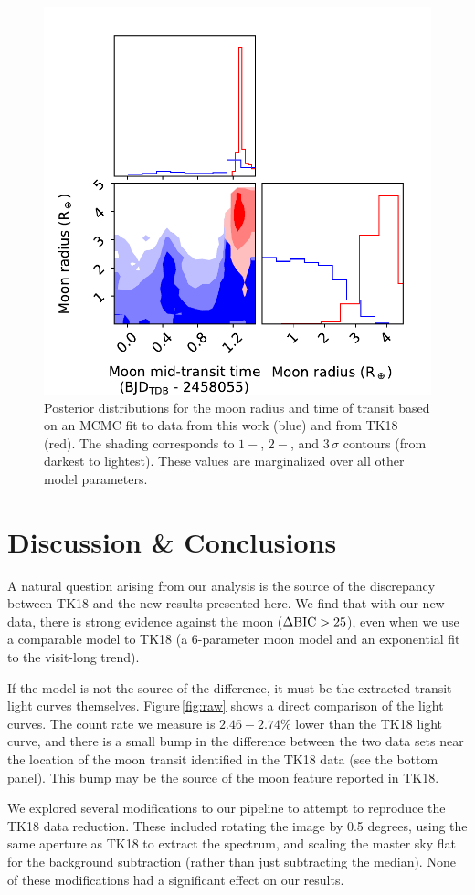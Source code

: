\documentclass[twocolumn]{aastex62}
\begin{document}
\begin{figure}
\includegraphics[width = 0.5 \textwidth]{fig5_pairs.pdf}
    \caption{Posterior distributions for the moon radius and time of transit based on an MCMC fit to data from this work (blue) and from TK18 (red). The shading corresponds to $1-$, $2-$, and $3\,\sigma$ contours (from darkest to lightest). These values are marginalized over all other model parameters.} 
\label{fig:corner}
\end{figure}

\section{Discussion \& Conclusions}
A natural question arising from our analysis is the source of the discrepancy between TK18 and the new results presented here. We find that with our new data, there is strong evidence against the moon ($\Delta\rm{BIC} > 25$), even when we use a comparable model to TK18 (a 6-parameter moon model and an exponential fit to the visit-long trend).

If the model is not the source of the difference, it must be the extracted transit light curves themselves.  Figure\,\ref{fig:raw} shows a direct comparison of the light curves. The count rate we measure is $2.46 -2.74\%$ lower than the TK18 light curve, and there is a small bump in the difference between the two data sets near the location of the moon transit identified in the TK18 data (see the bottom panel). This bump may be the source of the moon feature reported in TK18.

 We explored several modifications to our pipeline to attempt to reproduce the TK18 data reduction. These included rotating the image by 0.5 degrees, using the same aperture as TK18 to extract the spectrum, and scaling the master sky flat for the background subtraction (rather than just subtracting the median). None of these modifications had a significant effect on our results. 
\end{document}
